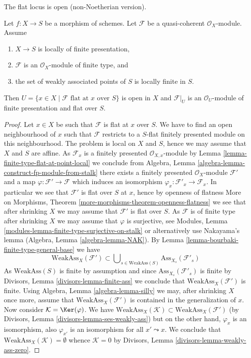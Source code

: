 \begin{theorem}
\label{theorem-finite-type-flat}
\begin{slogan}
The flat locus is open (non-Noetherian version).
\end{slogan}
Let $f : X \to S$ be a morphism of schemes.
Let $\mathcal{F}$ be a quasi-coherent $\mathcal{O}_X$-module.
Assume
\begin{enumerate}
\item $X \to S$ is locally of finite presentation,
\item $\mathcal{F}$ is an $\mathcal{O}_X$-module of finite type, and
\item the set of weakly associated points of $S$ is locally finite in $S$.
\end{enumerate}
Then $U = \{x \in X \mid \mathcal{F}\text{ flat at }x\text{ over }S\}$
is open in $X$ and $\mathcal{F}|_U$ is an $\mathcal{O}_U$-module
of finite presentation and flat over $S$.
\end{theorem}

\begin{proof}
Let $x \in X$ be such that $\mathcal{F}$ is flat at $x$ over $S$.
We have to find an open neighbourhood of $x$ such that $\mathcal{F}$ restricts
to a $S$-flat finitely presented module on this neighbourhood.
The problem is local on $X$ and $S$, hence we may assume that $X$ and $S$
are affine. As $\mathcal{F}_x$ is a finitely presented
$\mathcal{O}_{X, x}$-module by
Lemma \ref{lemma-finite-type-flat-at-point-local}
we conclude from
Algebra, Lemma \ref{algebra-lemma-construct-fp-module-from-stalk}
there exists a finitely presented $\mathcal{O}_X$-module $\mathcal{F}'$
and a map $\varphi : \mathcal{F}' \to \mathcal{F}$ which induces
an isomorphism $\varphi_x : \mathcal{F}'_x \to \mathcal{F}_x$. In particular
we see that $\mathcal{F}'$ is flat over $S$ at $x$, hence by openness
of flatness
More on Morphisms, Theorem \ref{more-morphisms-theorem-openness-flatness}
we see that after shrinking $X$ we may assume that
$\mathcal{F}'$ is flat over $S$. As $\mathcal{F}$ is of finite type
after shrinking $X$ we may assume that $\varphi$ is surjective, see
Modules, Lemma \ref{modules-lemma-finite-type-surjective-on-stalk}
or alternatively use Nakayama's lemma
(Algebra, Lemma \ref{algebra-lemma-NAK}).
By
Lemma \ref{lemma-bourbaki-finite-type-general-base}
we have
$$
\text{WeakAss}_X(\mathcal{F}') \subset
\bigcup\nolimits_{s \in \text{WeakAss}(S)} \text{Ass}_{X_s}(\mathcal{F}'_s)
$$
As $\text{WeakAss}(S)$ is finite by assumption and since
$\text{Ass}_{X_s}(\mathcal{F}'_s)$ is finite by
Divisors, Lemma \ref{divisors-lemma-finite-ass}
we conclude that $\text{WeakAss}_X(\mathcal{F}')$ is finite. Using
Algebra, Lemma \ref{algebra-lemma-silly}
we may, after shrinking $X$ once more, assume that
$\text{WeakAss}_X(\mathcal{F}')$ is contained in the generalization
of $x$. Now consider $\mathcal{K} = \Ker(\varphi)$. We have
$\text{WeakAss}_X(\mathcal{K}) \subset \text{WeakAss}_X(\mathcal{F}')$
(by
Divisors, Lemma \ref{divisors-lemma-ses-weakly-ass})
but on the other hand, $\varphi_x$ is an isomorphism, also $\varphi_{x'}$
is an isomorphism for all $x' \leadsto x$. We conclude that
$\text{WeakAss}_X(\mathcal{K}) = \emptyset$ whence
$\mathcal{K} = 0$ by
Divisors, Lemma \ref{divisors-lemma-weakly-ass-zero}.
\end{proof}